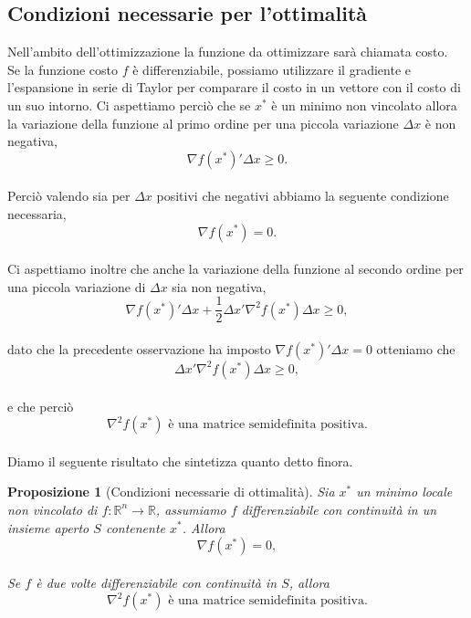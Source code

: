 \documentclass[a4paper, 12pt]{article}
\newtheorem{prop}{Proposizione}
\begin{document}
\subsection{Condizioni necessarie per l'ottimalità}
Nell'ambito dell'ottimizzazione la funzione da ottimizzare sarà chiamata costo.\\
Se la funzione costo $f$ è differenziabile, possiamo utilizzare il gradiente e l'espansione in serie di Taylor per comparare il costo in un vettore con il costo di un suo intorno.
Ci aspettiamo perciò che se $x^\ast$ è un minimo non vincolato allora la variazione della funzione al primo ordine per una piccola variazione $\Delta x$ è non negativa,\\
\[\nabla f ( x^\ast )' \Delta x \geq 0.\]\\
Perciò valendo sia per $\Delta x$ positivi che negativi abbiamo la seguente condizione necessaria,\\
\[\nabla f ( x^\ast ) = 0. \]\\
Ci aspettiamo inoltre che anche la variazione della funzione al secondo ordine per una piccola variazione di $\Delta x$ sia non negativa,\\
\[\nabla f ( x^\ast )' \Delta x + \frac{1}{2} \Delta x' \nabla ^2 f (x^\ast) \Delta x\geq 0,\]\\
dato che la precedente osservazione ha imposto $\nabla f (x^\ast)' \Delta x = 0$ otteniamo che\\
\[\Delta x' \nabla ^2 f (x^\ast) \Delta x\geq 0,\]\\
e che perciò\\
\[\nabla ^2 f (x^\ast) \mbox{ è una matrice semidefinita positiva.}\]\\
Diamo il seguente risultato che sintetizza quanto detto finora.
\begin{prop}[Condizioni necessarie di ottimalità]
Sia $x^\ast$ un minimo locale non vincolato di $f:\mathbb{R}^n \to \mathbb{R}$, assumiamo $f$ differenziabile con continuità in un insieme aperto $S$ contenente $x^\ast$. Allora\\
\[\nabla f(x^\ast) = 0,\]\\
Se $f$ è due volte differenziabile con continuità in $S$, allora\\
\[\nabla^2 f(x^\ast) \mbox{ è una matrice semidefinita positiva.}\]
\end{prop}
\end{document}
